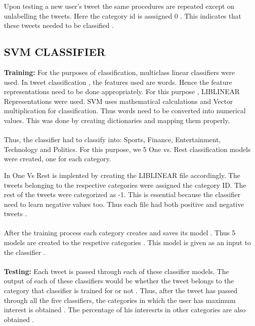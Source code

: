 Upon testing a new user's tweet the same procedures are repeated except on unlabelling the tweets. Here the category id is asssigned 0 . This indicates that these tweets needed to be classified .
\subsection{SVM CLASSIFIER}
\textbf{Training:}
For the purposes of classification, multiclass linear  classifiers were used. In tweet classification , the features used are words. Hence the feature representations need to be done appropriately. For this purpose , LIBLINEAR Representations were used.  SVM uses mathematical calculations and Vector multiplication for classification. Thus words need to be converted into numerical values. This was done by creating dictionaries and mapping them properly.
\paragraph{}
  Thus, the classifier had to classify into: Sports, Finance, Entertainment, Technology and  Politics. For this purpose, we 5 One vs. Rest classification models were created, one for each  category.
 
 
In One Vs Rest is implented by creating the LIBLINEAR file accordingly. The tweets belonging to the respective categories were assigned the category ID. The rest of the tweets were categorized as -1. This is essential because the classifier need to learn negative values too. Thus each file had both positive and negative tweets .
\paragraph{}

 

 
 \paragraph{}
  After the training process each category creates and saves its model . Thus 5 models are created to the respetive categories . This model is given as an input to the classifier . 
  \paragraph{} 
  \textbf{Testing:}
  Each tweet is passed through each of these classifier models. The output of each  of these classifiers would be whether the tweet belongs to the  category that classifier is trained for or not . Thus, after the tweet has passed  through all the five  classifiers, the categories in which the user has maximum interest is obtained . The percentage of his interesrts in other categories are also obtained .

